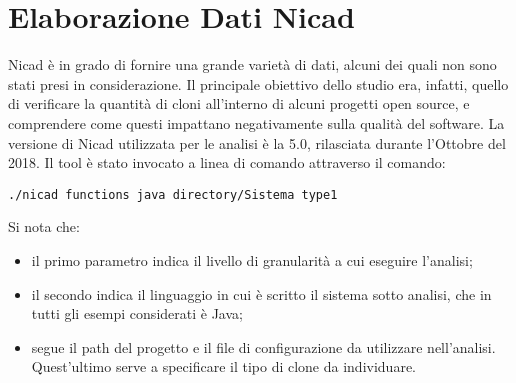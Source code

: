 \section{Elaborazione Dati Nicad}
Nicad è in grado di fornire una grande varietà di dati, alcuni dei quali non sono stati presi in considerazione. Il principale obiettivo dello studio era, infatti, quello di verificare la quantità di cloni all'interno di alcuni progetti open source, e comprendere come questi impattano negativamente sulla qualità del software.
La versione di Nicad utilizzata per le analisi è la 5.0, rilasciata durante l'Ottobre del 2018. 
Il tool è stato invocato a linea di comando attraverso il comando:
\begin{verbatim}
./nicad functions java directory/Sistema type1
\end{verbatim}
Si nota che:
\begin{itemize}
	\item il primo parametro indica il livello di granularità a cui eseguire l'analisi;
	\item il secondo indica il linguaggio in cui è scritto il sistema sotto analisi, che in tutti gli esempi considerati è Java;
	\item segue il path del progetto e il file di configurazione da utilizzare nell'analisi. Quest'ultimo serve a specificare il tipo di clone da individuare.
\end{itemize}

